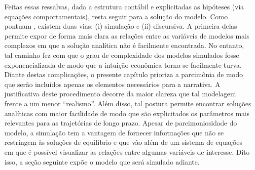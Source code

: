 


Feitas essas ressalvas, dada a estrutura contábil e explicitadas as hipóteses (via equações comportamentais), resta seguir para a solução do modelo. Como pontuam \textcite{caverzasi_stock-flow_2013}, existem duas vias: (i) simulação e (ii) discursiva. A primeira delas permite expor de forma mais clara as relações entre as variáveis de modelos mais complexos em que a solução analítica não é facilmente encontrada. No entanto, tal caminho fez com que o grau de complexidade dos modelos simulados fosse exponencializada de modo que a intuição econômica torna-se facilmente turva. Diante destas complicações, o presente capítulo prioriza a parcimônia de modo que serão incluídos apenas os elementos necessários para a narrativa. A justificativa deste procedimento decorre da maior clareza que tal modelagem frente a um menor ``realismo''. Além disso, tal postura permite encontrar soluções analíticas com maior facilidade de modo que são explicitados os parâmetros mais relevantes para as trajetórias de longo prazo. 
Apesar de parcimoniosidade do modelo, a simulação tem a vantagem de fornecer informações que não se restringem às soluções de equilíbrio e que vão além de um sistema de equações em que é possível visualizar as relações entre algumas variáveis de interesse. 
Dito isso, a seção seguinte expõe o modelo que será simulado adiante.